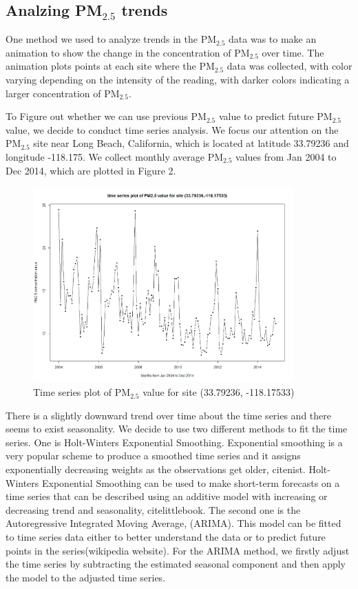 \documentclass[10pt]{article}
\begin{document}
\subsection{Analzing PM$_{2.5}$ trends}
One method we used to analyze trends in the PM$_{2.5}$ data was to make an animation to show the change in the concentration of PM$_{2.5}$  over time. The animation plots points at each site where the PM$_{2.5}$ data was collected, with color varying depending on the intensity of the reading, with darker colors indicating a larger concentration of PM$_{2.5}$. 

To Figure out whether we can use previous PM$_{2.5}$ value to predict future PM$_{2.5}$ value, we decide to conduct time series analysis. We focus our attention on the PM$_{2.5}$ site near Long Beach, California, which is located at latitude 33.79236 and longitude -118.175. We collect monthly average PM$_{2.5}$ values from Jan 2004 to Dec 2014, which are plotted in Figure 2.   

\begin{figure}[H]
\centering
\includegraphics[width = 100mm]{ts1.png}
\caption{Time series plot of PM$_{2.5}$ value for site (33.79236,	-118.17533)}
\end{figure}

There is a slightly downward trend over time about the time series and there seems to exist seasonality. We decide to use two different methods to fit the time series. One is Holt-Winters Exponential Smoothing. Exponential smoothing is a very popular scheme to produce a smoothed time series and it assigns exponentially decreasing weights as the observations get older, cite{nist}. Holt-Winters Exponential Smoothing can be used to make short-term forecasts on a time series that can be described using an additive model with increasing or decreasing trend and seasonality, cite{littlebook}. The second one is the  Autoregressive Integrated Moving Average, (ARIMA). This model can be fitted to time series data either to better understand the data or to predict future points in the series(wikipedia website). For the ARIMA method, we firstly adjust the time series by subtracting the estimated seasonal component and then apply the model to the adjusted time series.
\end{document}
